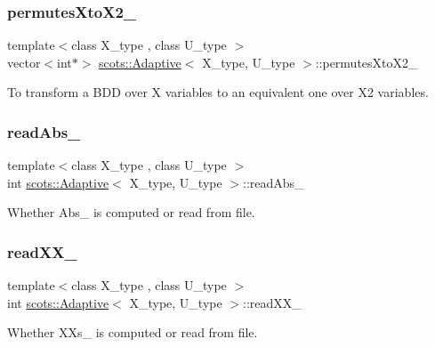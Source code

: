 \subsubsection{\texorpdfstring{permutes\+Xto\+X2\+\_\+}{permutesXtoX2\_}}
{\footnotesize\ttfamily template$<$class X\+\_\+type , class U\+\_\+type $>$ \\
vector$<$int$\ast$$>$ \hyperlink{classscots_1_1Adaptive}{scots\+::\+Adaptive}$<$ X\+\_\+type, U\+\_\+type $>$\+::permutes\+Xto\+X2\+\_\+}

To transform a B\+DD over X variables to an equivalent one over X2 variables. \mbox{\label{classscots_1_1Adaptive_a8c2a7e89feeb75f0b51fdf9c8d1359e7}} 
\subsubsection{\texorpdfstring{read\+Abs\+\_\+}{readAbs\_}}
{\footnotesize\ttfamily template$<$class X\+\_\+type , class U\+\_\+type $>$ \\
int \hyperlink{classscots_1_1Adaptive}{scots\+::\+Adaptive}$<$ X\+\_\+type, U\+\_\+type $>$\+::read\+Abs\+\_\+}

Whether Abs\+\_\+ is computed or read from file. \mbox{\label{classscots_1_1Adaptive_a95926f102459b6ec3525040c791ff359}} 
\subsubsection{\texorpdfstring{read\+X\+X\+\_\+}{readXX\_}}
{\footnotesize\ttfamily template$<$class X\+\_\+type , class U\+\_\+type $>$ \\
int \hyperlink{classscots_1_1Adaptive}{scots\+::\+Adaptive}$<$ X\+\_\+type, U\+\_\+type $>$\+::read\+X\+X\+\_\+}

Whether X\+Xs\+\_\+ is computed or read from file. \mbox{\label{classscots_1_1Adaptive_a0b300511b5f746c7b24ead30dc0ca9ac}} 
